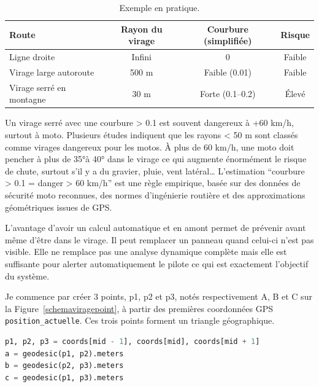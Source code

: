 \begin{table}[ht]
\centering
\begin{tabular}{|l|c|c|c|}
\hline
Route & Rayon du virage & Courbure (simplifiée) & Risque \\
\hline
Ligne droite & Infini & 0 & Faible \\
Virage large autoroute & 500 m & Faible (0.01) & Faible \\
Virage serré en montagne & 30 m & Forte (0.1–0.2) & Élevé \\
\hline
\end{tabular}
\caption{Exemple en pratique.}
\end{table}

Un virage serré avec une courbure > 0.1 est souvent dangereux à +60 km/h, surtout à moto.
Plusieurs études indiquent que les rayons < 50 m sont classés comme virages dangereux pour les motos. À plus de 60 km/h, une moto doit pencher à plus de 35°à 40° dans le virage ce qui augmente énormément le risque de chute, surtout s’il y a du gravier, pluie, vent latéral…
L’estimation “courbure > 0.1 = danger > 60 km/h” est une règle empirique, basée sur des données de sécurité moto reconnues, des normes d'ingénierie routière et des approximations géométriques issues de GPS.


L'avantage d'avoir un calcul automatique et en amont permet de prévenir avant même d'être dans le virage. Il peut remplacer un panneau quand celui-ci n'est pas visible. Elle ne remplace pas une analyse dynamique complète mais elle est suffisante pour alerter automatiquement le pilote ce qui est exactement l’objectif du système.

Je commence par créer 3 points, p1, p2 et p3, notés respectivement A, B et C sur la Figure~\ref{schemaviragepoint}, à partir des premières coordonnées GPS \texttt{position\_actuelle}. Ces trois points forment un triangle géographique.
\begin{lstlisting}[language=Python, caption={Calcul de points}]
p1, p2, p3 = coords[mid - 1], coords[mid], coords[mid + 1]
a = geodesic(p1, p2).meters
b = geodesic(p2, p3).meters
c = geodesic(p1, p3).meters
\end{lstlisting}


